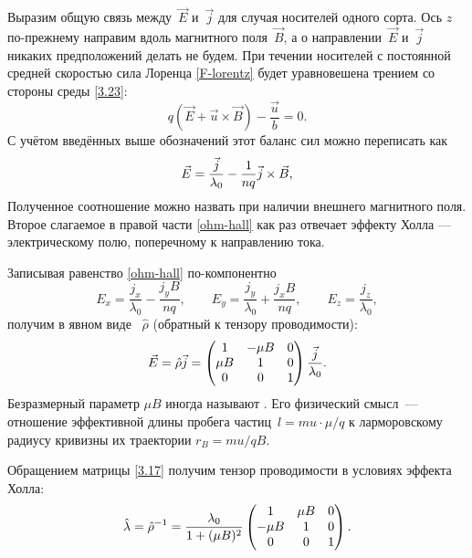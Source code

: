 Выразим общую связь между~$\vec{E}$ и~$\vec{j}$ для случая носителей одного сорта.
Ось $z$ по-прежнему направим вдоль магнитного поля~$\vec{B}$, а о
направлении~$\vec{E}$ и~$\vec{j}$ никаких предположений делать не будем.
При течении носителей с постоянной средней скоростью сила Лоренца
\eqref{F-lorentz} будет уравновешена трением со стороны среды \eqref{3.23}:
\begin{equation*}
    q(\vec{E}+\vec{u}\times \vec{B}) - \frac{\vec{u}}{b} =0.
\end{equation*}
С учётом введённых выше обозначений этот баланс сил можно переписать как
\begin{equation}
    \eqmark{ohm-hall}
    \vec{E} = \frac{\vec{j}}{\lambda_0} -
    \frac{1}{nq} \vec{j}\times\vec{B},
\end{equation}
Полученное соотношение можно назвать  при
наличии внешнего магнитного поля. Второе слагаемое в правой части \eqref{ohm-hall}
как раз отвечает эффекту Холла --- электрическому полю, поперечному к
направлению тока.

Записывая равенство \eqref{ohm-hall} по-компонентно
\[
E_x = \frac{j_x}{\lambda_0}  -  \frac{j_y B}{nq} ,\qquad
    E_y = \frac{j_y}{\lambda_0} +  \frac{j_xB}{nq} ,\qquad
    E_z = \frac{j_z}{\lambda_0},
\]
получим в явном виде
~$\hat{\rho}$ (обратный к тензору
проводимости):
\begin{equation}
    \vec{E}=\hat{\rho}\vec{j}= \left(
    \begin{matrix}
        1 & -\mu B & {0} \\
        \mu B & 1 & {0} \\
        {0} &{0}& 1
    \end{matrix}
    \right)
    \frac{\vec{j}}{\lambda_0}.
    \eqmark{3.17}
\end{equation}
Безразмерный параметр $\mu B$ иногда называют . 
Его физический смысл~--- отношение эффективной длины пробега частиц~$l=mu\cdot \mu/q$
к ларморовскому радиусу кривизны их траектории $r_B=mu/qB$.

Обращением матрицы \eqref{3.17} получим тензор проводимости
в условиях эффекта Холла:
\begin{equation}
    \hat{\lambda} = \hat{\rho}^{-1}=
    \frac{\lambda_0}{1+(\mu B)^2}\left(
    \begin{matrix}
        {1} & \mu B & {0} \\
        -\mu B & 1 & {0} \\
        {0} &{0}& 1 \\
    \end{matrix}
    \right).
    \eqmark{3.18}
\end{equation}


